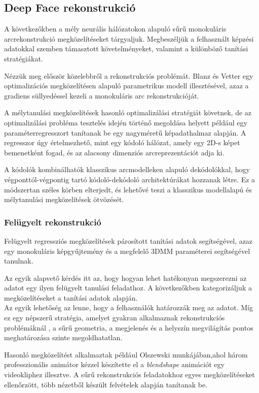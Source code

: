 \documentclass[12pt,a4]{article}
\begin{document}
	\subsection{Deep Face rekonstrukció}
	
	 A következőkben a mély neurális hálózatokon alapuló sűrű monokuláris arcrekonstrukció megközelítéseket tárgyaljuk. Megbeszéljük
	a felhasznált képzési adatokkal szemben támasztott követelményeket, valamint a különböző tanítási
	stratégiákat. 
	
	
	Nézzük meg először közelebbről a rekonstrukciós problémát. \cite{blanzvetter}Blanz és Vetter egy optimalizációs megközelítésen alapuló parametrikus modell illesztésével, azaz a gradiens süllyedéssel kezeli a monokuláris arc rekonstrukcióját. 
	
	 A mélytanulási megközelítések hasonló optimalizálási stratégiát követnek, de az optimalizálási probléma 
	tesztelés idején történő megoldása helyett például egy paraméterregresszort tanítanak be egy nagyméretű képadathalmaz alapján. A regresszor úgy értelmezhető, mint egy kódoló hálózat, amely egy 2D-s képet
	bemenetként fogad, és az alacsony dimenziós arcreprezentációt adja ki. 
	
	A
	kódolók kombinálhatók klasszikus arcmodelleken alapuló dekódolókkal,
	hogy végponttól-végpontig tartó kódoló-dekódoló architektúrákat hozzanak létre.
	Ez a módszertan széles körben elterjedt, és lehetővé teszi a klasszikus
	modellalapú és mélytanulási megközelítések ötvözését.
	
	\subsubsection{Felügyelt rekonstrukció}
	Felügyelt regressziós megközelítések
	párosított tanítási adatok segítségével, azaz egy monokuláris  képgyűjtemény
	és a megfelelő 3DMM paraméterei segítségével tanulnak.
	
	Az egyik alapvető kérdés itt az, hogy hogyan lehet hatékonyan megszerezni az adatot egy ilyen felügyelt tanulási feladathoz. A következőkben
	kategorizáljuk a megközelítéseket a
	tanítási adatok alapján. \\
	
	Az egyik lehetőség az lenne, hogy a felhasználók határozzák meg az adatot. Míg ez egy népszerű stratégia, amelyet gyakran alkalmaznak rekonstrukciós problémáknál \cite{saragih}, 
	a sűrű geometria, a megjelenés és a helyszín megvilágítás pontos meghatározása szinte megoldhatatlan.
	
	Hasonló megközelítést alkalmaztak például \cite{olszewski}Olszewski munkájában,ahol három professzionális animátor kézzel készítette el a \textit{blendshape} animációt egy videokliphez illesztve. A sűrű rekonstrukciós feladatokhoz egyes megközelítéseket ellenőrzött, több nézetből készült felvételek alapján tanítanak be.
	
\end{document}
